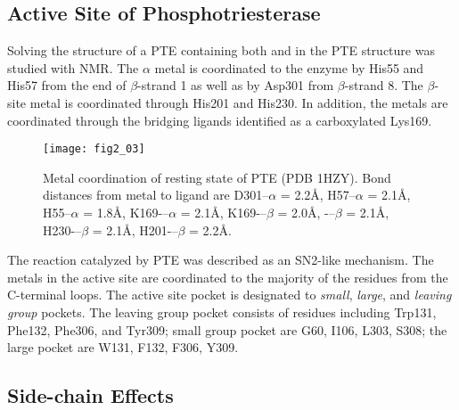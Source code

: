 \begin{refsection}
\subsection{Active Site of Phosphotriesterase}

Solving the structure of a PTE containing both  and
 in the PTE structure was studied with NMR\cite{Benning2001a}. The
$\alpha$ metal is coordinated to the enzyme by His55 and His57 from the
end of $\beta$-strand 1 as well as by Asp301 from $\beta$-strand 8. The
$\beta$-site metal is coordinated through His201 and His230. In addition, the
metals are coordinated through the bridging ligands identified as a
carboxylated Lys169.

\begin{figure}[h!] 
    \centering 
    \texttt{[image: fig2\_03]}
    \caption[Metal
        coordination of resting state of PTE (PDB 1HZY). Bond distances from
        metal to ligand are D301--$\alpha$ = 2.2\AA, H57--$\alpha$ = 2.1\AA,
        H55--$\alpha$ = 1.8\AA, K169-–$\alpha$ = 2.1\AA, K169-–$\beta$ =
        2.0\AA, -–$\beta$ = 2.1\AA, H230-–$\beta$ = 2.1\AA,
    H201-–$\beta$ = 2.2\AA.]{Metal coordination of resting state of PTE (PDB
        1HZY). Bond distances from metal to ligand are D301--$\alpha$ = 2.2\AA,
        H57--$\alpha$ = 2.1\AA, H55--$\alpha$ = 1.8\AA, K169-–$\alpha$ =
        2.1\AA, K169-–$\beta$ = 2.0\AA,
    -–$\beta$ = 2.1\AA, H230-–$\beta$ = 2.1\AA, H201-–$\beta$ = 2.2\AA.} 
    \label{fig:pte-active-site-chap2}
\end{figure}

The reaction catalyzed by PTE was described as an SN2-like mechanism. The metals in the
active site are coordinated to the majority of the residues from the C-terminal
loops. The active site pocket is designated to \emph{small}, \emph{large}, and
\emph{leaving group} pockets. The leaving group pocket consists of residues
including Trp131, Phe132, Phe306, and Tyr309; small group pocket are G60, I106,
L303, S308; the large pocket are W131, F132, F306, Y309.

\subsection{Side-chain Effects}
\label{sec:side-chain}


\end{refsection}
